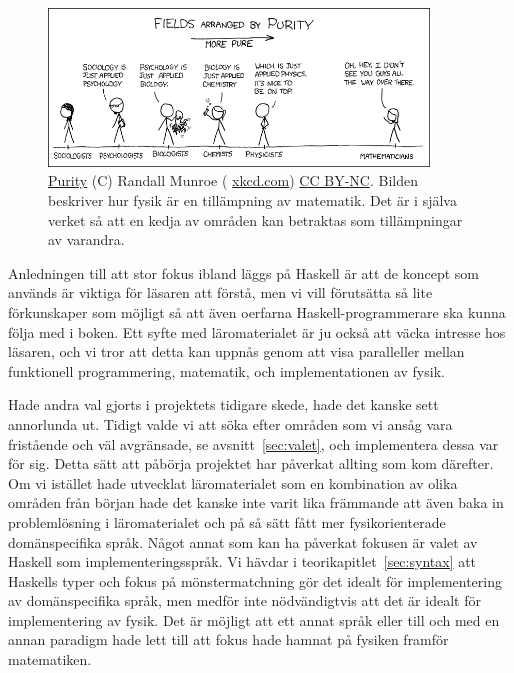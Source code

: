 \begin{figure}[tph]
  \centering
  \includegraphics[width=0.9\textwidth]{figure/purity.png}
  \caption{\href{https://xkcd.com/435/}{Purity} (C) Randall Munroe (
  \href{https://xkcd.com}{xkcd.com}) \href{https://creativecommons.org/licenses/by-nc/2.5/}{CC BY-NC}. Bilden beskriver hur fysik är en tillämpning av matematik. Det är i själva verket
så att en kedja av områden kan betraktas som tillämpningar av
varandra.}\label{fig:xkcd}
\end{figure}

Anledningen till att stor fokus ibland läggs på Haskell är att de
koncept som används är viktiga för läsaren att förstå, men vi vill
förutsätta så lite förkunskaper som möjligt så att även oerfarna
Haskell-programmerare ska kunna följa med i boken. Ett syfte med
läromaterialet är ju också att väcka intresse hos läsaren, och vi tror
att detta kan uppnås genom att visa paralleller mellan funktionell
programmering, matematik, och implementationen av fysik.

Hade andra val gjorts i projektets tidigare skede, hade det kanske
sett annorlunda ut. Tidigt valde vi att söka efter områden som vi
ansåg vara fristående och väl avgränsade, se avsnitt~\ref{sec:valet},
och implementera dessa var för sig. Detta sätt att påbörja projektet
har påverkat allting som kom därefter. Om vi istället hade utvecklat
läromaterialet som en kombination av olika områden från början hade
det kanske inte varit lika främmande att även baka in problemlösning i
läromaterialet och på så sätt fått mer fysikorienterade domänspecifika
språk. Något annat som kan ha påverkat fokusen är valet av Haskell som
implementeringsspråk. Vi hävdar i teorikapitlet~\ref{sec:syntax} att
Haskells typer och fokus på mönstermatchning gör det idealt för
implementering av domänspecifika språk, men medför inte nödvändigtvis
att det är idealt för implementering av fysik. Det är möjligt att ett
annat språk eller till och med en annan paradigm hade lett till att
fokus hade hamnat på fysiken framför matematiken.

